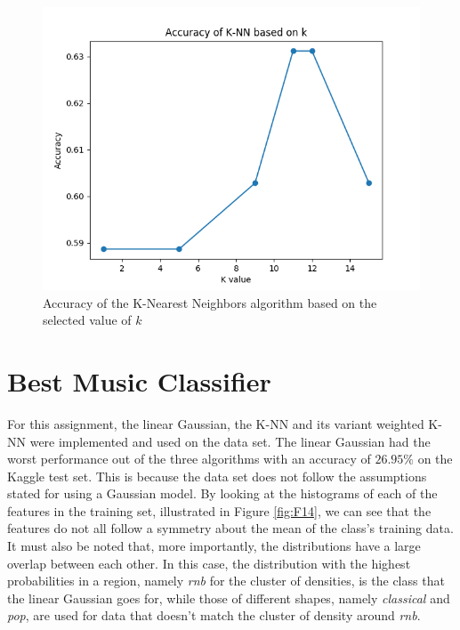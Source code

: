 \documentclass[11pt]{scrartcl}
\begin{document}
\begin{figure}[ht]
\centering	
\includegraphics[scale=0.75]{Figure_1.png}	
\caption{Accuracy of the K-Nearest Neighbors algorithm based on the selected value of $k$}
\label{fig:F1}
\end{figure}

\section{Best Music Classifier}

For this assignment, the linear Gaussian, the K-NN and its variant weighted K-NN were implemented and used on the data set. The linear Gaussian had the worst performance out of the three algorithms with an accuracy of $26.95\%$ on the Kaggle test set. This is because the data set does not follow the assumptions stated for using a Gaussian model. By looking at the histograms of each of the features in the training set, illustrated in Figure \ref{fig:F14}, we can see that the features do not all follow a symmetry about the mean of the class's training data. It must also be noted that, more importantly, the distributions have a large overlap between each other. In this case, the distribution with the highest probabilities in a region, namely \textit{rnb} for the cluster of densities, is the class that the linear Gaussian goes for, while those of different shapes, namely \textit{classical} and \textit{pop}, are used for data that doesn't match the cluster of density around \textit{rnb}.  
\end{document}

